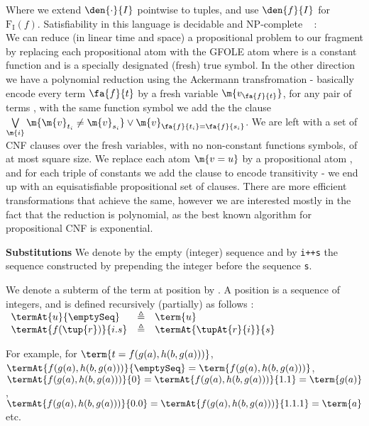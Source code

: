 Where we extend  $\den{\cdot}{I}$ pointwise to tuples, and use $\den{f}{I}$ for $\mathrm{F_I}(f)$.
Satisfiability in this language is decidable and NP-complete ~\cite{} :\\
We can reduce (in linear time and space) a propositional problem to our fragment by replacing each propositional atom  with the GFOLE atom  where  is a constant function and  is a specially designated (fresh) true symbol.
In the other direction we have a polynomial reduction using the Ackermann transfromation - basically encode every term $\fa{f}{t}$ by a fresh variable  $\m{v_\fa{f}{t}}$, for any pair of terms ,  with the same function symbol we add the the clause \\
$ \bigvee\limits_{\m{i}} \m{\m{v}_{t_i} \neq \m{v}_{s_i}} \lor \m{v}_{\fa{f}{t_i}=\fa{f}{s_i}}$. We are left with a set of CNF clauses over the fresh variables, with no non-constant functions symbols, of at most square size.
We replace each atom $\m{v=u}$ by a propositional atom , and for each triple of constants  we add the clause 
 to encode transitivity - we end up with an equisatisfiable propositional set of clauses.
There are more efficient transformations that achieve the same, however we are interested mostly in the fact that the reduction is polynomial, as the best known algorithm for propositional CNF is exponential.


\textbf{Substitutions}
We denote by \emptySeq the empty (integer) sequence and by \lstinline{i++s} the sequence constructed by prepending the integer  before the sequence \lstinline{s}.

We denote a subterm of the term  at position  by
.
A position is a sequence of integers, and  is defined recursively (partially) as follows :\\
$
\begin{array}{lll}
	\termAt{u}{\emptySeq}    & \triangleq & \term{u} \\
	\termAt{f(\tup{r})}{i.s} & \triangleq & \termAt{\tupAt{r}{i}}{s}
\end{array}
$

For example, for  $\term{t=f(g(a),h(b,g(a)))}$, \\
$\termAt{f(g(a),h(b,g(a)))}{\emptySeq}=\term{f(g(a),h(b,g(a)))}$, \\
$\termAt{f(g(a),h(b,g(a)))}{0}        =\termAt{f(g(a),h(b,g(a)))}{1.1}=\term{g(a)}$, \\
$\termAt{f(g(a),h(b,g(a)))}{0.0}      =\termAt{f(g(a),h(b,g(a)))}{1.1.1}=\term{a}$ \\
etc.

